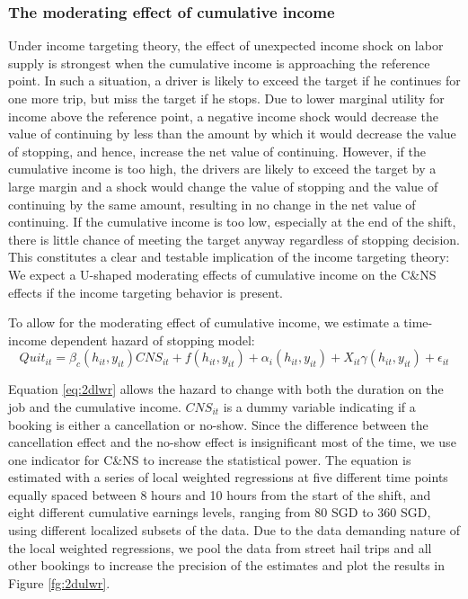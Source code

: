 \documentclass[reviewmode,AEJ]{AEA}
\begin{document}
\subsubsection{The moderating effect of cumulative income} Under income targeting theory, the effect of unexpected income shock on labor supply is strongest when the cumulative income is approaching the reference point. In such a situation, a driver is likely to exceed the target if he continues for one more trip, but  miss the target if he stops. Due to lower marginal utility for income above the reference point, a negative income shock would decrease the value of continuing by less than the amount by which it would decrease the value of stopping, and hence, increase the net value of continuing. However, if %
the cumulative income is too high, the drivers are likely to exceed the target by a large margin and a shock would change the value of stopping and the value of continuing by the same amount, resulting in no change in the net value of continuing. If the cumulative income is too low, especially at the end of the shift, there is little chance of meeting the target anyway regardless of stopping decision. This constitutes a clear and testable implication of the income targeting theory: We expect a U-shaped moderating effects of cumulative income on the C\&NS effects if the income targeting behavior is present.

To allow for the moderating effect of cumulative income, we estimate a time-income dependent hazard of stopping model:
\begin{equation}
    \label{eq:2dlwr}
    Quit_{it} = \beta_c(h_{it}, y_{it}) {CNS}_{it} + f(h_{it}, y_{it}) + \alpha_{i}(h_{it}, y_{it}) + X_{it}\gamma(h_{it}, y_{it}) + \epsilon_{it}
\end{equation}

Equation \eqref{eq:2dlwr} allows the hazard to change with both the duration on the job and the cumulative income. $CNS_{it}$ is a dummy variable indicating if a booking is either a cancellation or no-show.  Since the difference between the cancellation effect and the no-show effect is insignificant most of the time, we 
use one indicator for C\&NS to increase the statistical power. The equation is estimated with a series of local weighted regressions at five different time points equally spaced between 8 hours and 10 hours from the start of the shift, and eight different cumulative earnings levels, ranging from 80 SGD to 360 SGD, using different localized subsets of the data.  
Due to the data demanding nature of the local weighted regressions, we  pool the data from street hail trips and all other bookings to increase the precision of the estimates and plot the results in Figure \ref{fg:2dulwr}.
\end{document}
